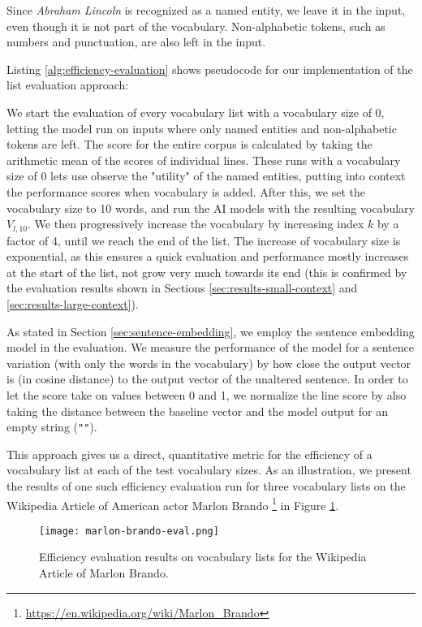 Since \textit{Abraham Lincoln} is recognized as a named entity, we leave it in the input, even though it is not part of the vocabulary.
Non-alphabetic tokens, such as numbers and punctuation, are also left in the input.

Listing \ref{alg:efficiency-evaluation} shows pseudocode for our implementation of the list evaluation approach:



We start the evaluation of every vocabulary list with a vocabulary size of 0, letting the model run on inputs where only named entities and non-alphabetic tokens are left.
The score for the entire corpus is calculated by taking the arithmetic mean of the scores of individual lines.
These runs with a vocabulary size of 0 lets use observe the "utility" of the named entities, putting into context the performance scores when vocabulary is added.
After this, we set the vocabulary size to 10 words, and run the AI models with the resulting vocabulary $V_{l, 10}$.
We then progressively increase the vocabulary by increasing index $k$ by a factor of 4, until we reach the end of the list.
The increase of vocabulary size is exponential, as this ensures a quick evaluation and performance mostly increases at the start of the list, not grow very much towards its end (this is confirmed by the evaluation results shown in Sections \ref{sec:results-small-context} and \ref{sec:results-large-context}).

As stated in Section \ref{sec:sentence-embedding}, we employ the sentence embedding model in the evaluation.
We measure the performance of the model for a sentence variation (with only the words in the vocabulary) by how close the output vector is (in cosine distance) to the output vector of the unaltered sentence.
In order to let the score take on values between 0 and 1, we normalize the line score by also taking the distance between the baseline vector and the model output for an empty string (\texttt{""}).

This approach gives us a direct, quantitative metric for the efficiency of a vocabulary list at each of the test vocabulary sizes.
As an illustration, we present the results of one such efficiency evaluation run for three vocabulary lists on the Wikipedia Article of American actor Marlon Brando \footnote{\url{https://en.wikipedia.org/wiki/Marlon_Brando}} in Figure \ref{fig:marlon-brando-eval}.

\begin{figure}[H]
	\centering
	\texttt{[image: marlon-brando-eval.png]}
	\caption{Efficiency evaluation results on vocabulary lists for the Wikipedia Article of Marlon Brando.}
	\label{fig:marlon-brando-eval}
\end{figure}


